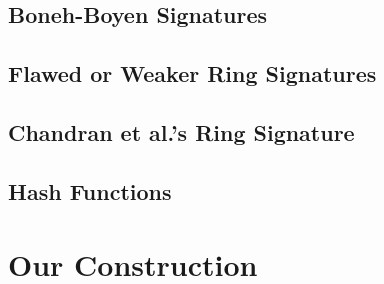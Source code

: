 \documentclass{llncs}
\begin{document}
        \subsection{Boneh-Boyen Signatures} \label{sec:bbs}
    
            

    \subsection{Flawed or Weaker Ring Signatures}\label{sec:rs-flawed}
    
         

       \subsection{Chandran et al.'s Ring Signature}
	
         

	\subsection{Hash Functions} \label{sec:hash}

	

    \section{Our Construction}

	
        
    	
        



\end{document}
